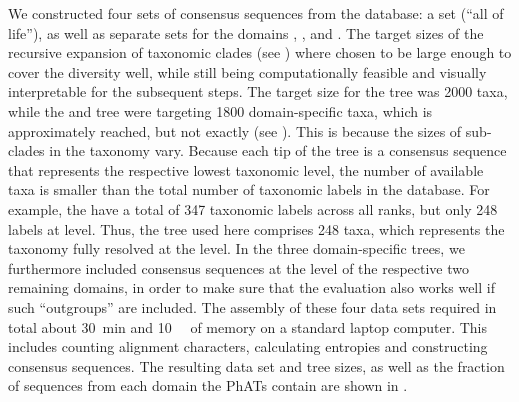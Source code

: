 We constructed four sets of consensus sequences from the  database:
a  set (``all of life''),
as well as separate sets for the domains , , and .
The target sizes of the recursive expansion of taxonomic clades
(see )
where chosen to be large enough to cover the diversity well,
while still being computationally feasible and visually interpretable for the subsequent steps.
The target size for the  tree was \num{2 000} taxa,
while the  and  tree were targeting \num{1 800} domain-specific taxa,
which is approximately reached, but not exactly (see ).
This is because the sizes of sub-clades in the taxonomy vary.
Because each tip of the tree is a consensus sequence that represents the respective lowest taxonomic level,
the number of available taxa is smaller than the total number of taxonomic labels in the  database.
For example, the  have a total of  \num{347} taxonomic labels across all ranks,
but only \num{248} labels at  level.
Thus, the  tree used here comprises \num{248} taxa,
which represents the  taxonomy fully resolved at the  level.
In the three domain-specific trees, we furthermore included consensus sequences at the  level
of the respective two remaining domains,
in order to make sure that the evaluation also works well if such ``outgroups'' are included.
The assembly of these four data sets required in total
about \SI{30}{\minute} and \SI{10}{\giga\byte} of memory on a standard laptop computer.
This includes counting alignment characters, calculating entropies and constructing consensus sequences.
The resulting data set and tree sizes, as well as the fraction of sequences from each domain the \acp{PhAT} contain
are shown in .

